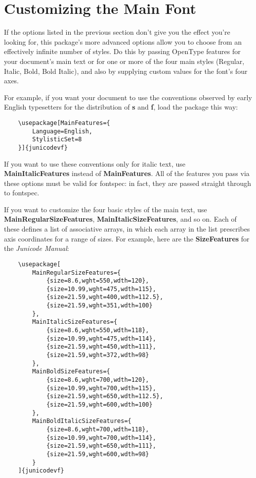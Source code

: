 \documentclass[12pt]{article}
\newcommand{\fspec}{{\sffamily fontspec}}
\newcommand{\option}[1]{{\color{RViolet}\textbf{#1}}}
\begin{document}
\section{Customizing the Main Font}

If the options listed in the previous section don’t give you the effect you’re looking for, this package’s 
more advanced options allow you to choose from an effectively infinite number of styles. Do this by passing 
OpenType features for your document’s main text or for one or more of the four main styles (Regular, Italic, 
Bold, Bold Italic), and also by supplying custom values for the font’s four axes.

For example, if you want your document to use the conventions observed by early
English typesetters for the distribution of \option{s} and \option{ſ}, load the
package this way:

\footnotesize
\begin{verbatim}
    \usepackage[MainFeatures={
        Language=English,
        StylisticSet=8
    }]{junicodevf}
\end{verbatim}
\normalsize

\noindent If you want to use these conventions only for italic text, use
\option{MainItalicFeatures} instead of \option{MainFeatures}. All of the
features you pass via these options must be valid for \fspec: in fact,
they are passed straight through to \fspec.

If you want to customize the four basic styles of the main text, use
\option{MainRegularSizeFeatures}, \option{MainItalicSizeFeatures}, and so on.
Each of these defines a list of associative arrays, in which each array in the
list prescribes axis coordinates for a range of sizes.
For example, here are the \textbf{SizeFeatures} for the \textit{Junicode Manual}:

\footnotesize
\begin{verbatim}
    \usepackage[
        MainRegularSizeFeatures={
            {size=8.6,wght=550,wdth=120},
            {size=10.99,wght=475,wdth=115},
            {size=21.59,wght=400,wdth=112.5},
            {size=21.59,wght=351,wdth=100}
        },
        MainItalicSizeFeatures={
            {size=8.6,wght=550,wdth=118},
            {size=10.99,wght=475,wdth=114},
            {size=21.59,wght=450,wdth=111},
            {size=21.59,wght=372,wdth=98}
        },
        MainBoldSizeFeatures={
            {size=8.6,wght=700,wdth=120},
            {size=10.99,wght=700,wdth=115},
            {size=21.59,wght=650,wdth=112.5},
            {size=21.59,wght=600,wdth=100}
        },
        MainBoldItalicSizeFeatures={
            {size=8.6,wght=700,wdth=118},
            {size=10.99,wght=700,wdth=114},
            {size=21.59,wght=650,wdth=111},
            {size=21.59,wght=600,wdth=98}
        }
    ]{junicodevf}
\end{verbatim}
\normalsize
\end{document}
